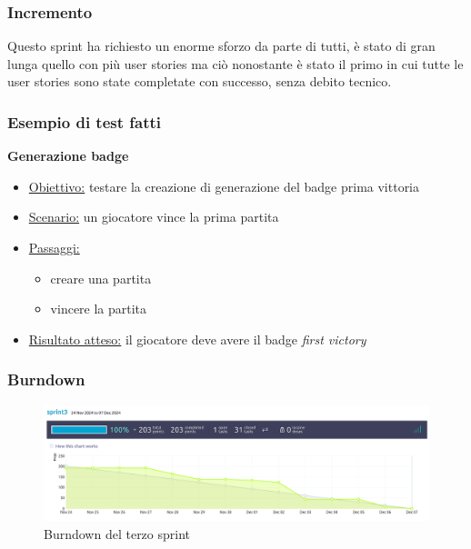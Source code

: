 \documentclass{article}
\begin{document}
\subsubsection{Incremento}
Questo sprint ha richiesto un enorme sforzo da parte di tutti, è stato di gran lunga quello con più user stories ma ciò nonostante è stato il primo in cui 
tutte le user stories sono state completate con successo, senza debito tecnico.

\subsubsection{Esempio di test fatti}

\textbf{Generazione badge}
\begin{itemize}
    \item \underline{Obiettivo:} testare la creazione di generazione del badge prima vittoria
    \item \underline{Scenario:} un giocatore vince la prima partita
    \item \underline{Passaggi:}
    \begin{itemize}
    \item creare una partita
    \item vincere la partita
    \end{itemize}
    \item \underline{Risultato atteso:} il giocatore deve avere il badge \textit{first victory}
\end{itemize}

\subsubsection{Burndown}
\begin{figure}[H]
    \centering
    \includegraphics[width=1\textwidth]{burndown3}
    \caption{Burndown del terzo sprint}
    \label{fig:burndown3}
\end{figure}
\end{document}

